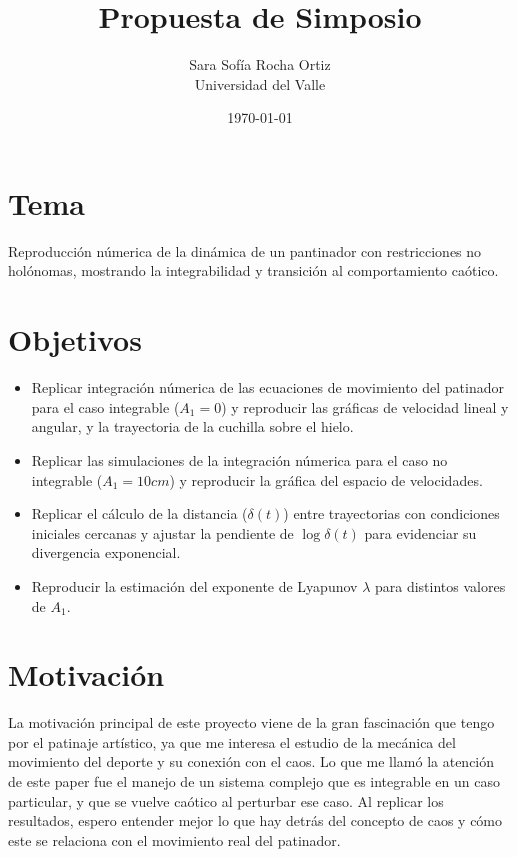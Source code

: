 \documentclass[12pt]{article}
\title{Propuesta de Simposio}
\author{Sara Sofía Rocha Ortiz \\ Universidad del Valle}
\date{\today}
\begin{document}
	\maketitle
	
	\section*{Tema }
	
	Reproducción númerica de la dinámica de un pantinador con restricciones no holónomas, mostrando la integrabilidad y transición al comportamiento caótico. 
	
	
	
	
	\section*{Objetivos}

	\begin{itemize}
		\item Replicar integración númerica de las ecuaciones de movimiento del patinador para el caso integrable ($A_1=0$) y reproducir las gráficas de velocidad lineal y angular, y la trayectoria de la cuchilla sobre el hielo.
		\item Replicar las simulaciones de la integración númerica para el caso no integrable ($A_1=10 cm$) y reproducir la gráfica del espacio de velocidades.
		\item Replicar el cálculo de la distancia ($\delta(t)$) entre trayectorias con condiciones iniciales cercanas y ajustar la pendiente de $\log \delta(t)$ para evidenciar su divergencia exponencial.
		\item Reproducir la estimación del exponente de Lyapunov $\lambda$ para distintos valores de $A_1$.
	\end{itemize}
	
	

	\section*{Motivación}
La motivación principal de este proyecto viene de la gran fascinación que tengo por el patinaje artístico, ya que me interesa el estudio de la mecánica del movimiento del deporte y su conexión con el caos. Lo que me llamó la atención de este paper fue el manejo de un sistema complejo que es integrable en un caso particular, y que se vuelve caótico al perturbar ese caso. Al replicar los resultados, espero entender mejor lo que hay detrás del concepto de caos y cómo este se relaciona con el movimiento real del patinador. 
\end{document}
